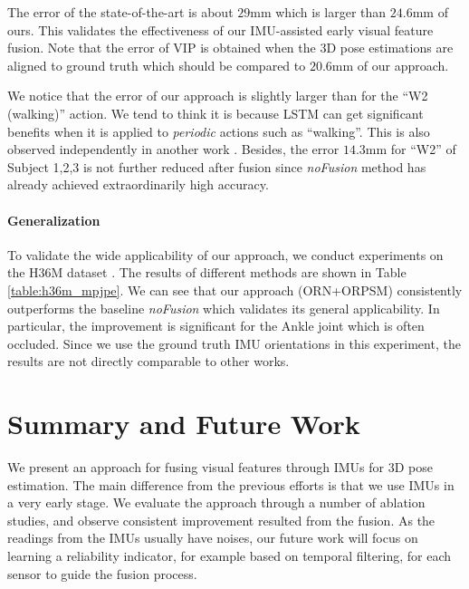 \documentclass[10pt,twocolumn,letterpaper]{article}
\begin{document}
The error of the state-of-the-art is about $29$mm \cite{qiu2019cross} which is larger than $24.6$mm of ours. This validates the effectiveness of our IMU-assisted early visual feature fusion. Note that the error of VIP \cite{von2018recovering} is obtained when the $3$D pose estimations are aligned to ground truth which should be compared to $20.6$mm of our approach. 



We notice that the error of our approach is slightly larger than \cite{trumble2018deep} for the ``W2 (walking)'' action. We tend to think it is because LSTM can get significant benefits when it is applied to \emph{periodic} actions such as ``walking''. This is also observed independently in another work \cite{gilbert2019fusing}. Besides, the error $14.3$mm for ``W2'' of Subject 1,2,3 is not further reduced after fusion since \textit{noFusion} method has already achieved extraordinarily high accuracy.




\paragraph{Generalization} To validate the wide applicability of our approach, we conduct experiments on the H36M dataset \cite{ionescu2014human3}. The results of different methods are shown in Table \ref{table:h36m_mpjpe}. We can see that our approach (ORN+ORPSM) consistently outperforms the baseline \emph{noFusion} which validates its general applicability. In particular, the improvement is significant for the Ankle joint which is often occluded. Since we use the ground truth IMU orientations in this experiment, the results are not directly comparable to other works.




\section{Summary and Future Work}
We present an approach for fusing visual features through IMUs for $3$D pose estimation. The main difference from the previous efforts is that we use IMUs in a very early stage. We evaluate the approach through a number of ablation studies, and observe consistent improvement resulted from the fusion. As the readings from the IMUs usually have noises, our future work will focus on learning a reliability indicator, for example based on temporal filtering, for each sensor to guide the fusion process.

\small


\end{document}
